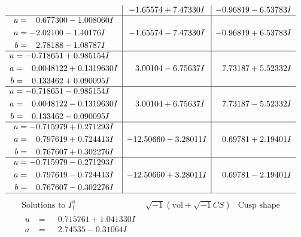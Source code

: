 \documentclass[1p]{elsarticle_modified}
\theoremstyle{definition}
\newcommand{\I}{\sqrt{-1}}
\begin{document}
$$\begin{array}{c|c|c}
 & -1.65574 + 7.47330 I & -0.96819 - 6.53783 I \\ \hline\begin{aligned}
u &= \phantom{-}0.677300 - 1.008060 I \\
a &= -2.02100 - 1.40176 I \\
b &= \phantom{-}2.78188 - 1.08787 I\end{aligned}
 & -1.65574 - 7.47330 I & -0.96819 + 6.53783 I \\ \hline\begin{aligned}
u &= -0.718651 + 0.985154 I \\
a &= \phantom{-}0.0048122 + 0.1319630 I \\
b &= \phantom{-}0.133462 + 0.090095 I\end{aligned}
 & \phantom{-}3.00104 - 6.75637 I & \phantom{-}7.73187 + 5.52332 I \\ \hline\begin{aligned}
u &= -0.718651 - 0.985154 I \\
a &= \phantom{-}0.0048122 - 0.1319630 I \\
b &= \phantom{-}0.133462 - 0.090095 I\end{aligned}
 & \phantom{-}3.00104 + 6.75637 I & \phantom{-}7.73187 - 5.52332 I \\ \hline\begin{aligned}
u &= -0.715979 + 0.271293 I \\
a &= \phantom{-}0.797619 + 0.724413 I \\
b &= \phantom{-}0.767607 + 0.302276 I\end{aligned}
 & -12.50660 - 3.28011 I & \phantom{-}0.69781 + 2.19401 I \\ \hline\begin{aligned}
u &= -0.715979 - 0.271293 I \\
a &= \phantom{-}0.797619 - 0.724413 I \\
b &= \phantom{-}0.767607 - 0.302276 I\end{aligned}
 & -12.50660 + 3.28011 I & \phantom{-}0.69781 - 2.19401 I\\
 \hline 
 \end{array}$$\newpage$$\begin{array}{c|c|c}  
\text{Solutions to }I^u_{1}& \I (\text{vol} + \sqrt{-1}CS) & \text{Cusp shape}\\
 \hline 
\begin{aligned}
u &= \phantom{-}0.715761 + 1.041330 I \\
a &= \phantom{-}2.74535 - 0.31064 I \\

\end{aligned}
\end{array}$$
\end{document}
